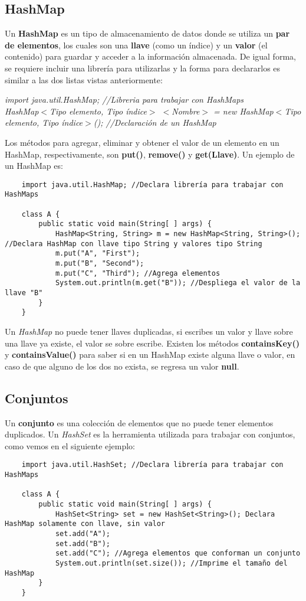 \subsection{HashMap}
Un \textbf{HashMap} es un tipo de almacenamiento de datos donde se utiliza un \textbf{par de elementos}, los cuales son una \textbf{llave} (como un índice) y un \textbf{valor} (el contenido) para guardar y acceder a la información almacenada. De igual forma, se requiere incluir una librería para utilizarlas y la forma para declararlos es similar a las dos listas vistas anteriormente:\begin{center}\textit{import java.util.HashMap; //Libreria para trabajar con HashMaps\\HashMap$<$Tipo elemento, Tipo índice$>$ $<$Nombre$>$ = new HashMap$<$Tipo elemento, Tipo índice$>$(); //Declaración de un HashMap}\end{center}
Los métodos para agregar, eliminar y obtener el valor de un elemento en un HashMap, respectivamente, son \textbf{put()}, \textbf{remove()} y \textbf{get(Llave)}. Un ejemplo de un HashMap es:
\begin{lstlisting}
    import java.util.HashMap; //Declara librería para trabajar con HashMaps
    
    class A {
        public static void main(String[ ] args) {
            HashMap<String, String> m = new HashMap<String, String>(); //Declara HashMap con llave tipo String y valores tipo String
            m.put("A", "First");
            m.put("B", "Second");
            m.put("C", "Third"); //Agrega elementos
            System.out.println(m.get("B")); //Despliega el valor de la llave "B"
        }
    }
\end{lstlisting}
Un \textit{HashMap} no puede tener llaves duplicadas, si escribes un valor y llave sobre una llave ya existe, el valor se sobre escribe. Existen los métodos \textbf{containsKey()} y \textbf{containsValue()} para saber si en un HashMap existe alguna llave o valor, en caso de que alguno de los dos no exista, se regresa un valor \textbf{null}.

\subsection{Conjuntos}
Un \textbf{conjunto} es una colección de elementos que no puede tener elementos duplicados. Un \textit{HashSet} es la herramienta utilizada para trabajar con conjuntos, como vemos en el siguiente ejemplo:
\begin{lstlisting}
    import java.util.HashSet; //Declara librería para trabajar con HashMaps
    
    class A {
        public static void main(String[ ] args) {
            HashSet<String> set = new HashSet<String>(); Declara HashMap solamente con llave, sin valor
            set.add("A");
            set.add("B");	
            set.add("C"); //Agrega elementos que conforman un conjunto
            System.out.println(set.size()); //Imprime el tamaño del HashMap
        }
    }
\end{lstlisting}

